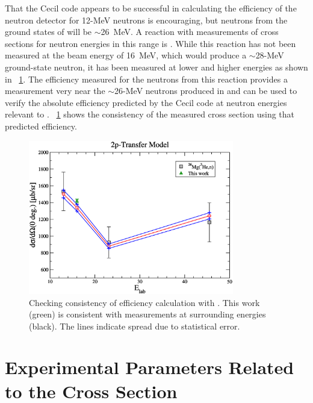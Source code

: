 That the Cecil code appears to be successful in calculating the efficiency of the neutron detector for 12-MeV neutrons is encouraging, but neutrons from the ground states of \reaction will be $\sim$26~MeV.  A reaction with measurements of cross sections for neutron energies in this range is \MgReaction.  While this reaction has not been measured at the beam energy of 16~MeV, which would produce a $\sim$28-MeV ground-state neutron, it has been measured at lower and higher energies as shown in {\fig}~\ref{fig:efficiencyCalib}.  The efficiency measured for the neutrons from this reaction provides a measurement very near the $\sim$26-MeV neutrons produced in \reaction and can be used to verify the absolute efficiency predicted by the Cecil code at neutron energies relevant to \reaction.  {\fig}~\ref{fig:efficiencyCalib} shows the consistency of the measured cross section using that predicted efficiency.
\begin{figure}[!htbp]
\centering
\includegraphics[width=0.8\textwidth]{figures/magnesiumMatch.eps}
\caption{Checking consistency of efficiency calculation with \MgReaction.  This work (green) is consistent with measurements at surrounding energies (black).  The lines indicate spread due to statistical error.}
\label{fig:efficiencyCalib}
\end{figure}

\section{Experimental Parameters Related to the Cross Section}


